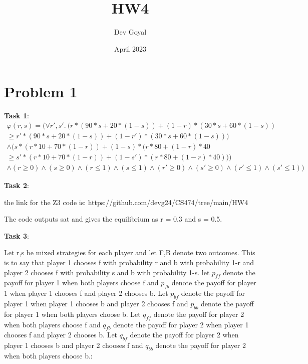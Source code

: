 \documentclass[12pt]{article}
\title{HW4}
\author{Dev Goyal}
\date{April 2023}
\begin{document}
\maketitle

\section*{Problem 1}

\noindent \textbf{Task 1}: \newline
\begin {equation}
\begin{split}
    \varphi (r,s) = (\forall r',s'. \ (r*(90*s + 20*(1-s)) + (1-r)*(30*s + 60*(1-s)) \\ \geq r'*(90*s + 20*(1-s)) + (1-r')*(30*s + 60*(1-s))) \\ 
    \land (s*(r*10 + 70 * (1-r)) + (1-s)*(r*80 + (1-r)*40 \\ \geq s'*(r*10 + 70 * (1-r)) + (1-s')*(r*80 + (1-r)*40)))\\ \land (r \geq 0) \land (s \geq 0) \land (r \leq 1) \land (s \leq 1) \land (r' \geq 0) \land (s' \geq 0) \land (r' \leq 1) \land (s' \leq 1))
\end{split}
\end {equation}

\noindent \textbf{Task 2}: \newline

the link for the Z3 code is: https://github.com/devg24/CS474/tree/main/HW4

The code outputs sat and gives the equilibrium as r = 0.3 and s = 0.5.

\noindent \textbf{Task 3}: \newline

Let r,s be mixed strategies for each player and let F,B denote two outcomes. This is to say that player 1 chooses f with probability r and b with probability 1-r and player 2 chooses f with probability s and b with probability 1-s. let $p_{ff}$ denote the payoff for player 1 when both players choose f and $p_{fb}$ denote the payoff for player 1 when player 1 chooses f and player 2 chooses b. Let $p_{bf}$ denote the payoff for player 1 when player 1 chooses b and player 2 chooses f and $p_{bb}$ denote the payoff for player 1 when both players choose b. Let $q_{ff}$ denote the payoff for player 2 when both players choose f and $q_{fb}$ denote the payoff for player 2 when player 1 chooses f and player 2 chooses b. Let $q_{bf}$ denote the payoff for player 2 when player 1 chooses b and player 2 chooses f and $q_{bb}$ denote the payoff for player 2 when both players choose b.:
\end{document}
